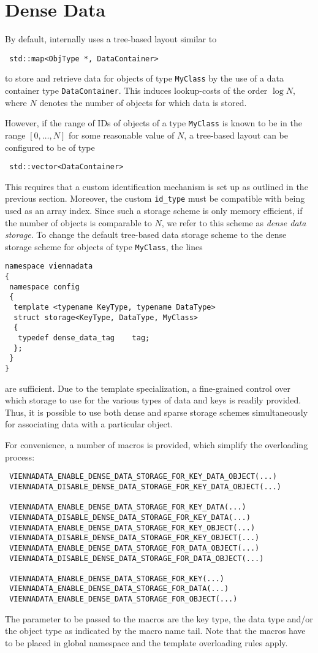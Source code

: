 \section{Dense Data} \label{sec:dense-data}
By default, {\ViennaData} internally uses a tree-based layout similar to
\begin{lstlisting}
 std::map<ObjType *, DataContainer>
\end{lstlisting}
to store and retrieve data for objects of type \lstinline|MyClass| by the use of a data container type \lstinline|DataContainer|.
This induces lookup-costs of the order $\log N$, where $N$ denotes the number of objects for which data is stored.

However, if the range of IDs of objects of a type \lstinline|MyClass| is known to be in the range $[0, \ldots, N]$ for some reasonable value of $N$,
a tree-based layout can be configured to be of type
\begin{lstlisting}
 std::vector<DataContainer>
\end{lstlisting}
This requires that a custom identification mechanism is set up as outlined in the previous section. Moreover, the
custom \lstinline|id_type| must be compatible with being used as an array index. Since such a storage scheme is only memory efficient,
if the number of objects is comparable to $N$, we refer to this scheme as \emph{dense data storage}.
To change the default tree-based data storage scheme to the dense storage scheme for objects of type \lstinline|MyClass|, the lines
\begin{lstlisting}
namespace viennadata
{
 namespace config
 {
  template <typename KeyType, typename DataType>
  struct storage<KeyType, DataType, MyClass>
  {
   typedef dense_data_tag    tag;
  };
 }
}
\end{lstlisting}
are sufficient. Due to the template specialization, a fine-grained control over which storage to use for the various types of data and keys is readily provided. Thus, it is possible to use both dense and sparse storage schemes simultaneously for associating data with a particular object.

For convenience, a number of macros is provided, which simplify the overloading process:
\begin{lstlisting}
 VIENNADATA_ENABLE_DENSE_DATA_STORAGE_FOR_KEY_DATA_OBJECT(...)
 VIENNADATA_DISABLE_DENSE_DATA_STORAGE_FOR_KEY_DATA_OBJECT(...)

 VIENNADATA_ENABLE_DENSE_DATA_STORAGE_FOR_KEY_DATA(...)
 VIENNADATA_DISABLE_DENSE_DATA_STORAGE_FOR_KEY_DATA(...)
 VIENNADATA_ENABLE_DENSE_DATA_STORAGE_FOR_KEY_OBJECT(...)
 VIENNADATA_DISABLE_DENSE_DATA_STORAGE_FOR_KEY_OBJECT(...)
 VIENNADATA_ENABLE_DENSE_DATA_STORAGE_FOR_DATA_OBJECT(...)
 VIENNADATA_DISABLE_DENSE_DATA_STORAGE_FOR_DATA_OBJECT(...)

 VIENNADATA_ENABLE_DENSE_DATA_STORAGE_FOR_KEY(...)
 VIENNADATA_ENABLE_DENSE_DATA_STORAGE_FOR_DATA(...)
 VIENNADATA_ENABLE_DENSE_DATA_STORAGE_FOR_OBJECT(...)
\end{lstlisting}
The parameter to be passed to the macros are the key type, the data type and/or the object type as indicated by the macro name tail.
Note that the macros have to be placed in global namespace and the template overloading rules apply.

